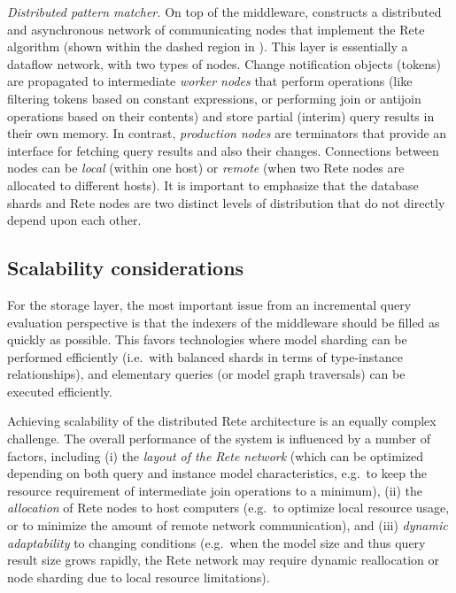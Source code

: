 \emph{Distributed pattern matcher.}\label{distributed_pattern_matcher}
On top of the middleware, \iqd{} constructs a distributed and asynchronous network of communicating nodes that implement the Rete~\cite{Forgy} algorithm (shown within the dashed region in ). %
This layer is essentially a dataflow network, with two types of nodes. Change notification objects (tokens) are propagated to intermediate \emph{worker nodes} that perform operations (like filtering tokens based on constant expressions, or performing join or antijoin operations based on their contents) and
store partial (interim) query results in their own memory. In contrast, \emph{production nodes} are terminators that provide an interface for fetching query results and also their changes. Connections between nodes can be \emph{local} (within one host) or \emph{remote} (when two Rete nodes are allocated to different hosts). It is important to emphasize that the database shards and Rete nodes are two distinct levels of distribution that do not directly depend upon each other.



\subsection{Scalability considerations}
For the storage layer, the most important issue from an incremental query evaluation perspective is that the indexers of the middleware should be filled as quickly as possible. This favors technologies where model sharding can be performed efficiently (i.e.\ with balanced shards in terms of type-instance relationships), and elementary queries (or model graph traversals) can be executed efficiently.

Achieving scalability of the distributed Rete architecture is an equally complex challenge. The overall performance of the system is influenced by a number of factors, including (i) the \emph{layout of the Rete network} (which can be optimized depending on both query and instance model characteristics, e.g.\ to keep the resource requirement of intermediate join operations to a minimum), (ii) the \emph{allocation} of Rete nodes to host computers (e.g.\ to optimize local resource usage, or to minimize the amount of remote network communication), and (iii) \emph{dynamic adaptability} to changing conditions (e.g.\ when the model size and thus query result size grows rapidly, the Rete network may require dynamic reallocation or node sharding due to local resource limitations).
